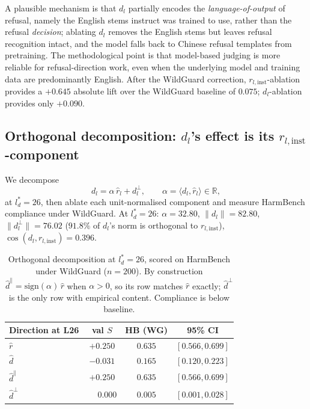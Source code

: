 \documentclass{article}
\newcommand{\rinst}{r_{l,\mathrm{inst}}}
\newcommand{\dinst}{d_{l}}
\begin{document}
A plausible mechanism is that $\dinst$ partially encodes the
\emph{language-of-output} of refusal, namely the English stems
instruct was trained to use, rather than the refusal
\emph{decision}; ablating $\dinst$ removes the English stems but
leaves refusal recognition intact, and the model falls back to
Chinese refusal templates from pretraining. The methodological
point is that model-based judging is more reliable for
refusal-direction work, even when the underlying model and training
data are predominantly English. After the WildGuard correction,
$\rinst$-ablation provides a $+0.645$ absolute lift over the
WildGuard baseline of $0.075$; $\dinst$-ablation provides only
$+0.090$.

\subsection{Orthogonal decomposition: $\dinst$'s effect is its
$\rinst$-component}
\label{sec:phase1_ortho}

We decompose
\[
  \dinst = \alpha\,\hat{r}_{l} + d_{l}^{\perp},
  \qquad
  \alpha = \langle \dinst, \hat{r}_{l} \rangle \in \mathbb{R},
\]
at $l^{*}_d = 26$, then ablate each unit-normalised component and
measure HarmBench compliance under WildGuard. At $l^{*}_d=26$:
$\alpha = 32.80$, $\|\dinst\| = 82.80$, $\|d_{l}^{\perp}\| = 76.02$
($91.8\%$ of $\dinst$'s norm is orthogonal to $\rinst$),
$\cos(\dinst, \rinst) = 0.396$.

\begin{table}[t]
\caption{Orthogonal decomposition at $l^{*}_d=26$, scored on
HarmBench under WildGuard ($n=200$). By construction
$\hat{d}^{\parallel}=\mathrm{sign}(\alpha)\,\hat{r}$ when $\alpha>0$,
so its row matches $\hat{r}$ exactly; $\hat{d}^{\perp}$ is the only
row with empirical content. Compliance is below baseline.}
\label{tab:phase1_ortho}
\centering
\small
\begin{tabular}{lccc}
\toprule
Direction at L26 & val $S$ & HB (WG) & 95\% CI \\
\midrule
$\hat{r}$            & $+0.250$ & $0.635$ & $[0.566, 0.699]$ \\
$\hat{d}$            & $-0.031$ & $0.165$ & $[0.120, 0.223]$ \\
$\hat{d}^{\parallel}$ & $+0.250$ & $0.635$ & $[0.566, 0.699]$ \\
$\hat{d}^{\perp}$    & $\phantom{+}0.000$ & $\mathbf{0.005}$ & $[0.001, 0.028]$ \\
\bottomrule
\end{tabular}
\end{table}
\end{document}

